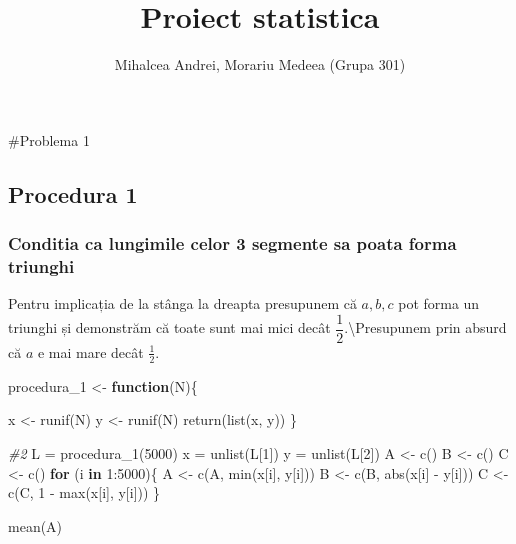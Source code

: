 \documentclass[
]{article}
\title{Proiect statistica}
\subtitle{Mihalcea Andrei, Morariu Medeea (Grupa 301)}
\author{}
\date{\vspace{-2.5em}}
\newenvironment{Shaded}{\begin{snugshade}}{\end{snugshade}}
\newcommand{\CommentTok}[1]{\textcolor[rgb]{0.56,0.35,0.01}{\textit{#1}}}
\newcommand{\ControlFlowTok}[1]{\textcolor[rgb]{0.13,0.29,0.53}{\textbf{#1}}}
\newcommand{\DecValTok}[1]{\textcolor[rgb]{0.00,0.00,0.81}{#1}}
\newcommand{\FunctionTok}[1]{\textcolor[rgb]{0.00,0.00,0.00}{#1}}
\newcommand{\NormalTok}[1]{#1}
\newcommand{\OtherTok}[1]{\textcolor[rgb]{0.56,0.35,0.01}{#1}}
\newcommand{\SpecialCharTok}[1]{\textcolor[rgb]{0.00,0.00,0.00}{#1}}
\begin{document}
\maketitle

\#Problema 1

\hypertarget{procedura-1}{%
\subsection{Procedura 1}\label{procedura-1}}

\hypertarget{conditia-ca-lungimile-celor-3-segmente-sa-poata-forma-triunghi}{%
\subsubsection{Conditia ca lungimile celor 3 segmente sa poata forma
triunghi}\label{conditia-ca-lungimile-celor-3-segmente-sa-poata-forma-triunghi}}

Pentru implicația de la stânga la dreapta presupunem că \(a,b,c\) pot
forma un triunghi și demonstrăm că toate sunt mai mici decât
\(\dfrac{1}{2}\).\textbackslash Presupunem prin absurd că \(a\) e mai
mare decât \(\frac{1}{2}\).

\begin{Shaded}
\begin{Highlighting}[]
\NormalTok{procedura\_1 }\OtherTok{\textless{}{-}} \ControlFlowTok{function}\NormalTok{(N)\{}
  
\NormalTok{x }\OtherTok{\textless{}{-}} \FunctionTok{runif}\NormalTok{(N)}
\NormalTok{y }\OtherTok{\textless{}{-}} \FunctionTok{runif}\NormalTok{(N)}
\FunctionTok{return}\NormalTok{(}\FunctionTok{list}\NormalTok{(x, y))}
\NormalTok{\}}

\CommentTok{\#2}
\NormalTok{L }\OtherTok{=} \FunctionTok{procedura\_1}\NormalTok{(}\DecValTok{5000}\NormalTok{)}
\NormalTok{x }\OtherTok{=} \FunctionTok{unlist}\NormalTok{(L[}\DecValTok{1}\NormalTok{])}
\NormalTok{y }\OtherTok{=} \FunctionTok{unlist}\NormalTok{(L[}\DecValTok{2}\NormalTok{])}
\NormalTok{A }\OtherTok{\textless{}{-}} \FunctionTok{c}\NormalTok{()}
\NormalTok{B }\OtherTok{\textless{}{-}} \FunctionTok{c}\NormalTok{()}
\NormalTok{C }\OtherTok{\textless{}{-}} \FunctionTok{c}\NormalTok{()}
\ControlFlowTok{for}\NormalTok{ (i }\ControlFlowTok{in} \DecValTok{1}\SpecialCharTok{:}\DecValTok{5000}\NormalTok{)\{}
\NormalTok{  A }\OtherTok{\textless{}{-}} \FunctionTok{c}\NormalTok{(A, }\FunctionTok{min}\NormalTok{(x[i], y[i]))}
\NormalTok{  B }\OtherTok{\textless{}{-}} \FunctionTok{c}\NormalTok{(B, }\FunctionTok{abs}\NormalTok{(x[i] }\SpecialCharTok{{-}}\NormalTok{ y[i]))}
\NormalTok{  C }\OtherTok{\textless{}{-}} \FunctionTok{c}\NormalTok{(C, }\DecValTok{1} \SpecialCharTok{{-}} \FunctionTok{max}\NormalTok{(x[i], y[i]))}
\NormalTok{\}}

\FunctionTok{mean}\NormalTok{(A)}
\end{Highlighting}
\end{Shaded}
\end{document}

